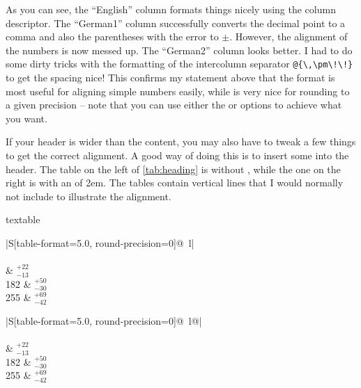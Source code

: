As you can see, the \enquote{English} column formats things nicely using
the  column descriptor. The \enquote{German1} column successfully
converts the decimal point to a comma and also the parentheses with
the error to \(\pm\). However, the alignment of the numbers is now
messed up. The \enquote{German2} column looks better. I had to do some dirty
tricks with the formatting of the intercolumn separator
\verb+@{\,\pm\!\!}+ to get the spacing nice! This confirms my
statement above that the  format is most useful for aligning
simple numbers easily, while  is very nice for rounding to
a given precision -- note that you can use either the  or
 options to achieve what you want.

If your header is wider than the content,
you may also have to tweak a few things to get the correct alignment.
A good way of doing this is to insert some  into the header.
The table on the left of \cref{tab:heading} is without , while the one on the right is
with an  of 2em.
The tables contain vertical lines that I would normally not include to illustrate the alignment.

\begin{table}[htbp]
\begin{tcblisting}{textable}
\caption{Table illustrating how to centre numbers
  if the heading is wider than them.}%
\label{tab:heading}
\renewcommand{\arraystretch}{1.4}
\centering
\begin{tabular}{|S[table-format=5.0, round-precision=0]@{\,} l|}
  \toprule
   \\
   \\
   & \(^{+22}_{-13}\) \\
    182 & \(^{+50}_{-30}\) \\
    255 & \(^{+69}_{-42}\) \\
  \bottomrule
\end{tabular}
\qquad
\begin{tabular}{|S[table-format=5.0, round-precision=0]@{\,}
  l@{\hspace*{2em}}|}
  \toprule
   \\
   \\
   & \(^{+22}_{-13}\) \\
    182 & \(^{+50}_{-30}\) \\
    255 & \(^{+69}_{-42}\) \\
  \bottomrule
\end{tabular}
\end{tcblisting}
\end{table}


